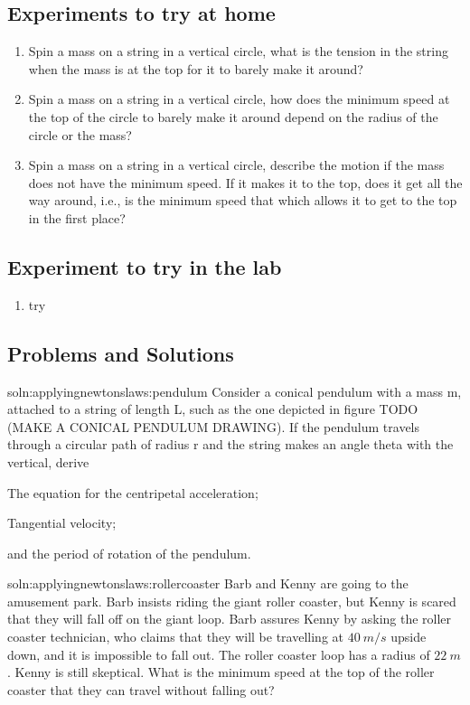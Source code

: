 \subsection{Experiments to try at home}

\begin{enumerate}
\item Spin a mass on a string in a vertical circle, what is the tension in the string when the mass is at the top for it to barely make it around?
\item Spin a mass on a string in a vertical circle, how does the minimum speed at the top of the circle to barely make it around  depend on the radius of the circle or the mass?
\item Spin a mass on a string in a vertical circle, describe the motion if the mass does not have the minimum speed. If it makes it to the top, does it get all the way around, i.e., is the minimum speed that which allows it to get to the top in the first place?
\end{enumerate}
\subsection{Experiment to try in the lab}
\begin{enumerate}
\item try
\end{enumerate}

\subsection{Problems and Solutions}

\begin{problemParts}{soln:applyingnewtonslaws:pendulum}{\label{prob:applyingnewtonslaws:pendulum} Consider a conical pendulum with a mass m, attached to a string of length L, such as the one depicted in figure TODO (MAKE A CONICAL PENDULUM DRAWING). If the pendulum travels through a circular path of radius r and the string makes an angle theta with the vertical, derive}
\item The equation for the centripetal acceleration;
\item Tangential velocity;
\item and the period of rotation of the pendulum.
\end{problemParts}

\begin{problem}{soln:applyingnewtonslaws:rollercoaster}{\label{prob:applyingnewtonslaws:rollercoaster} Barb and Kenny are going to the amusement park. Barb insists riding the giant roller coaster, but Kenny is scared that they will fall off on the giant loop. Barb assures Kenny by asking the roller coaster technician, who claims that they will be travelling at $\SI{40}{m/s}$ upside down, and it is impossible to fall out. The roller coaster loop has a radius of $\SI{22}{m}$. Kenny is still skeptical. What is the minimum speed at the top of the roller coaster that they can travel without falling out?}
\end{problem}

